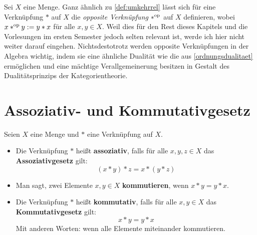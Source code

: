 \begin{vorschau}
    Sei $X$ eine Menge. Ganz ähnlich zu \cref{def:umkehrrel} lässt sich für eine Verknüpfung $*$ auf $X$ die \emph{opposite Verknüpfung} $*^{\mathrm{op}}$ auf $X$ definieren, wobei $x*^{\mathrm{op}} y:=y*x$ für alle $x,y\in X$. Weil dies für den Rest dieses Kapitels und die Vorlesungen im ersten Semester jedoch selten relevant ist, werde ich hier nicht weiter darauf eingehen. Nichtsdestotrotz werden opposite Verknüpfungen in der Algebra wichtig, indem sie eine ähnliche Dualität wie die aus \cref{ordnungsdualitaet} ermöglichen und eine mächtige Verallgemeinerung besitzen in Gestalt des Dualitätsprinzips der Kategorientheorie.
\end{vorschau}




\section{Assoziativ- und Kommutativgesetz}


\begin{defin}  
    Seien $X$ eine Menge und $*$ eine Verknüpfung auf $X$.
    \begin{itemize}
        \item Die Verknüpfung $*$ heißt \textbf{assoziativ}, falls für alle $x,y,z\in X$ das \textbf{Assoziativgesetz} gilt:
            \[ (x*y)*z = x*(y*z) \]
        \item Man sagt, zwei Elemente $x,y\in X$ \textbf{kommutieren}, wenn $x*y=y*x$.
        \item Die Verknüpfung $*$ heißt \textbf{kommutativ}, falls für alle $x,y\in X$ das \textbf{Kommutativgesetz} gilt:
            \[ x*y = y*x \]
        Mit anderen Worten: wenn alle Elemente miteinander kommutieren.
    \end{itemize}
\end{defin}


